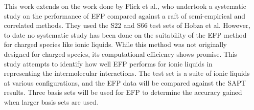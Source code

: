 This work extends on the work done by Flick et al.,
who undertook a systematic study on the performance of EFP compared against a raft of semi-empirical and correlated methods.
They used the S22 and S66 test sets of Hobza et al.
However, to date no systematic study has been done on the suitability of the EFP method for charged species like ionic liquids. 
While this method was not originally designed for charged species, its computational efficiency shows promise. 
This study attempts to identify how well EFP performs for ionic liquids in representing the intermolecular interactions.
The test set is a suite of ionic liquids at various configurations, and the EFP data will be compared against the SAPT results.
Three basis sets will be used for EFP to determine the accuracy gained when larger basis sets are used.

